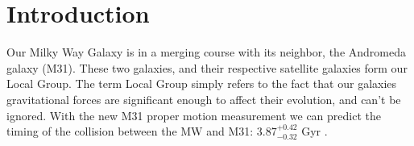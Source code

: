 \documentclass{aastex63}
\begin{document}
\author{José Pérez Chávez}




\section{Introduction} \label{sec:intro}

Our Milky Way Galaxy is in a merging course with its neighbor, 
the Andromeda galaxy (M31). These two galaxies, and their respective
satellite galaxies form our Local Group. The term Local Group simply refers
to the fact that our galaxies gravitational forces are significant enough to
affect their evolution, and can't be ignored. With the new M31 proper motion
measurement we can predict the timing of the collision between the MW and
M31: $3.87^{+0.42}_{-0.32}$ Gyr \citep{2012ApJ...753....9V}. 
\end{document}
